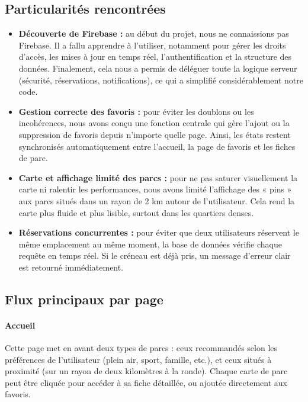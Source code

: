 \documentclass[12pt,a4paper]{article}
\begin{document}
\subsection{Particularités rencontrées}
\begin{itemize}
\item \textbf{Découverte de Firebase :} au début du projet, nous ne connaissions pas Firebase. Il a fallu apprendre à l'utiliser, notamment pour gérer les droits d'accès, les mises à jour en temps réel, l'authentification et la structure des données. Finalement, cela nous a permis de déléguer toute la logique serveur (sécurité, réservations, notifications), ce qui a simplifié considérablement notre code.
\item \textbf{Gestion correcte des favoris :} pour éviter les doublons ou les incohérences, nous avons conçu une fonction centrale qui gère l'ajout ou la suppression de favoris depuis n'importe quelle page. Ainsi, les états restent synchronisés automatiquement entre l'accueil, la page de favoris et les fiches de parc.

\item \textbf{Carte et affichage limité des parcs :} pour ne pas saturer visuellement la carte ni ralentir les performances, nous avons limité l'affichage des « pins » aux parcs situés dans un rayon de 2 km autour de l'utilisateur. Cela rend la carte plus fluide et plus lisible, surtout dans les quartiers denses.

\item \textbf{Réservations concurrentes :} pour éviter que deux utilisateurs réservent le même emplacement au même moment, la base de données vérifie chaque requête en temps réel. Si le créneau est déjà pris, un message d'erreur clair est retourné immédiatement.


\end{itemize}

\subsection{Flux principaux par page}

\paragraph{Accueil \\}
Cette page met en avant deux types de parcs : ceux recommandés selon les préférences de l'utilisateur (plein air, sport, famille, etc.), et ceux situés à proximité (sur un rayon de deux kilomètres à la ronde). Chaque carte de parc peut être cliquée pour accéder à sa fiche détaillée, ou ajoutée directement aux favoris.
\end{document}
